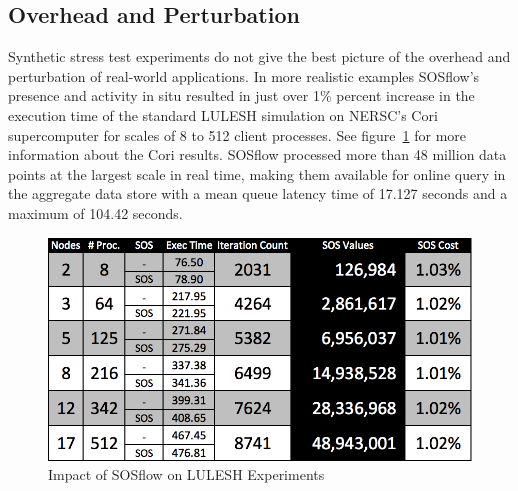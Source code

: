 
\subsection{Overhead and Perturbation}

Synthetic stress test experiments do not give the best picture of the
overhead and perturbation of real-world applications.
%
In more realistic examples SOSflow's presence and activity in situ
resulted in just over 1\% percent increase in the execution time of
the standard LULESH simulation on NERSC's Cori supercomputer for
scales of 8 to 512 client processes.
%
See figure~\ref{cori_results} for more information about the Cori
results.
%
SOSflow processed more than 48 million data points at the largest
scale in real time, making them available for online query in the
aggregate data store with a mean queue latency time of 17.127 seconds
and a maximum of 104.42 seconds.

\begin{figure}[!t]
\centering
\includegraphics[width=5in]{images/cori_results.png}
\caption{Impact of SOSflow on LULESH Experiments}
\label{cori_results}
\end{figure}

